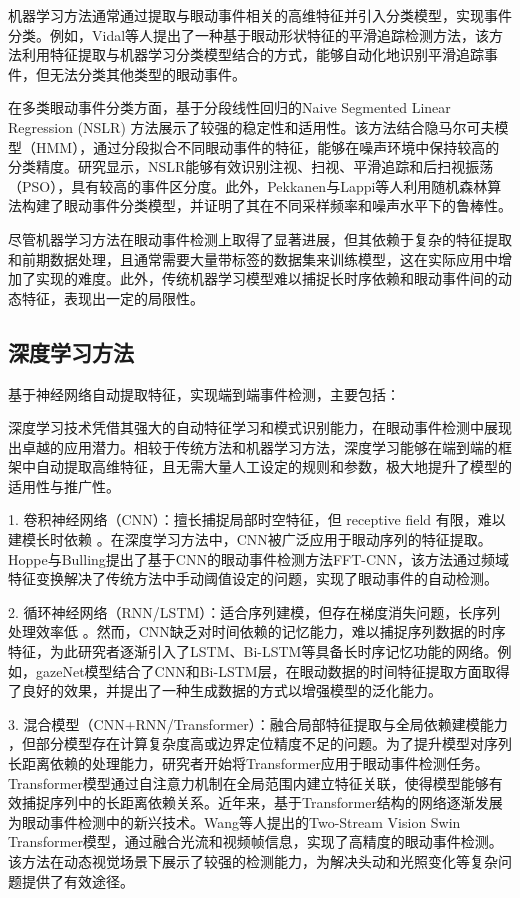\documentclass{xdupgthesis}
\begin{document}
机器学习方法通常通过提取与眼动事件相关的高维特征并引入分类模型，实现事件分类。例如，Vidal等人提出了一种基于眼动形状特征的平滑追踪检测方法，该方法利用特征提取与机器学习分类模型结合的方式，能够自动化地识别平滑追踪事件，但无法分类其他类型的眼动事件。

在多类眼动事件分类方面，基于分段线性回归的Naive Segmented Linear Regression (NSLR) 方法展示了较强的稳定性和适用性。该方法结合隐马尔可夫模型（HMM），通过分段拟合不同眼动事件的特征，能够在噪声环境中保持较高的分类精度。研究显示，NSLR能够有效识别注视、扫视、平滑追踪和后扫视振荡（PSO），具有较高的事件区分度。此外，Pekkanen与Lappi等人利用随机森林算法构建了眼动事件分类模型，并证明了其在不同采样频率和噪声水平下的鲁棒性。

尽管机器学习方法在眼动事件检测上取得了显著进展，但其依赖于复杂的特征提取和前期数据处理，且通常需要大量带标签的数据集来训练模型，这在实际应用中增加了实现的难度。此外，传统机器学习模型难以捕捉长时序依赖和眼动事件间的动态特征，表现出一定的局限性。

\subsection{深度学习方法}
基于神经网络自动提取特征，实现端到端事件检测，主要包括：

深度学习技术凭借其强大的自动特征学习和模式识别能力，在眼动事件检测中展现出卓越的应用潜力。相较于传统方法和机器学习方法，深度学习能够在端到端的框架中自动提取高维特征，且无需大量人工设定的规则和参数，极大地提升了模型的适用性与推广性。

1. 卷积神经网络（CNN）：擅长捕捉局部时空特征，但 receptive field 有限，难以建模长时依赖 \cite{hoppe2016end,birawo2022review}。在深度学习方法中，CNN被广泛应用于眼动序列的特征提取。Hoppe与Bulling提出了基于CNN的眼动事件检测方法FFT-CNN，该方法通过频域特征变换解决了传统方法中手动阈值设定的问题，实现了眼动事件的自动检测。

2. 循环神经网络（RNN/LSTM）：适合序列建模，但存在梯度消失问题，长序列处理效率低 \cite{goltz2019exploring,li2021attention}。然而，CNN缺乏对时间依赖的记忆能力，难以捕捉序列数据的时序特征，为此研究者逐渐引入了LSTM、Bi-LSTM等具备长时序记忆功能的网络。例如，gazeNet模型结合了CNN和Bi-LSTM层，在眼动数据的时间特征提取方面取得了良好的效果，并提出了一种生成数据的方式以增强模型的泛化能力。

3. 混合模型（CNN+RNN/Transformer）：融合局部特征提取与全局依赖建模能力 \cite{zemblys2019gazenet,suhari2023improving}，但部分模型存在计算复杂度高或边界定位精度不足的问题。为了提升模型对序列长距离依赖的处理能力，研究者开始将Transformer应用于眼动事件检测任务。Transformer模型通过自注意力机制在全局范围内建立特征关联，使得模型能够有效捕捉序列中的长距离依赖关系。近年来，基于Transformer结构的网络逐渐发展为眼动事件检测中的新兴技术。Wang等人提出的Two-Stream Vision Swin Transformer模型，通过融合光流和视频帧信息，实现了高精度的眼动事件检测。该方法在动态视觉场景下展示了较强的检测能力，为解决头动和光照变化等复杂问题提供了有效途径。
\end{document}
